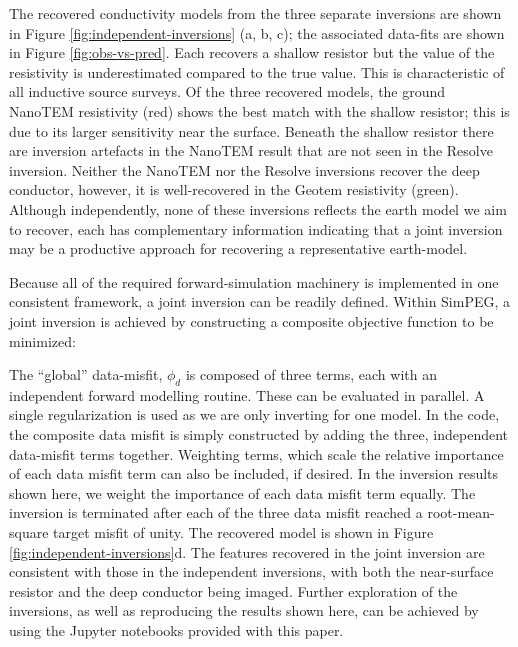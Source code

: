 \documentclass[paper]{geophysics}
\begin{document}
The recovered conductivity  models from the three separate inversions are shown in Figure \ref{fig:independent-inversions} (a, b, c); the associated data-fits are shown in Figure \ref{fig:obs-vs-pred}. Each recovers a shallow resistor but the value of the resistivity is underestimated compared to the true value. This is characteristic of all inductive source surveys. Of the three recovered models, the ground NanoTEM resistivity (red) shows the best match with the shallow resistor; this is due to its larger sensitivity  near the surface. Beneath the shallow resistor there are inversion artefacts in the NanoTEM result that are not seen in the Resolve inversion. Neither the NanoTEM nor the  Resolve inversions recover the deep conductor, however, it is well-recovered in the Geotem resistivity (green).  Although independently, none of these inversions reflects the earth model we aim to recover, each has complementary information indicating that a joint inversion may be a productive approach for recovering a representative earth-model.





Because all of the required forward-simulation machinery is implemented in one consistent framework, a joint inversion can be readily defined. Within SimPEG, a joint inversion is achieved by constructing a composite objective function to be minimized:

The ``global'' data-misfit, $\phi_d$ is composed of three terms, each with an independent forward modelling routine. These can be evaluated in parallel. A single regularization is used as we are only inverting for one model. In the code, the composite data misfit is simply constructed by adding the three, independent data-misfit terms together. Weighting terms, which scale the relative importance of each data misfit term can also be included, if desired. In the inversion results shown here, we weight the importance of each data misfit term equally. The inversion is terminated after each of the three data misfit reached a root-mean-square target misfit of unity.  The recovered model is shown in Figure \ref{fig:independent-inversions}d. The features recovered in the joint inversion are consistent with those in the independent inversions, with both the near-surface resistor and the deep conductor being imaged. Further exploration of the inversions, as well as reproducing the results shown here, can be achieved by using the Jupyter notebooks provided with this paper.
\end{document}
